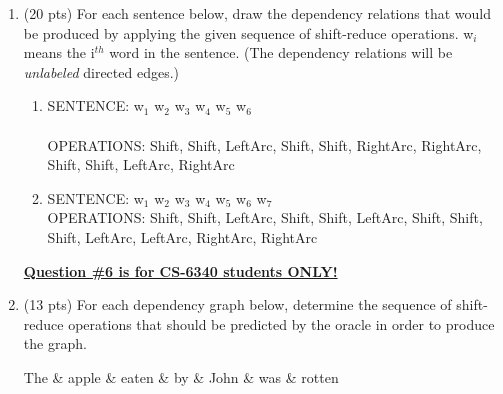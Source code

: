 \documentclass[11pt]{article}
\begin{document}
\begin{enumerate}
\newpage
\item (20 pts) For each sentence below, draw the dependency relations
  that would be produced by applying the given sequence of
  shift-reduce operations. w$_{i}$ means the i$^{th}$ word in the
  sentence. (The dependency relations will be {\it unlabeled} directed
  edges.)
  \\
	
	\begin{enumerate}
		\item
		SENTENCE: w$_{1}$ w$_{2}$ w$_{3}$ w$_{4}$ w$_{5}$ w$_{6}$ \\\\
		OPERATIONS: Shift, Shift, LeftArc, Shift, Shift, RightArc, RightArc, Shift, Shift, LeftArc, RightArc \\

		\vspace{.5in}
	
	
	
		\item
		SENTENCE: w$_{1}$ w$_{2}$ w$_{3}$ w$_{4}$ w$_{5}$ w$_{6}$ w$_{7}$ \\
		
		OPERATIONS: Shift, Shift, LeftArc, Shift, Shift, LeftArc, Shift, Shift, Shift, LeftArc, LeftArc, RightArc, RightArc\\

		\vspace{.5in}
	\end{enumerate}

\newpage

\underline{\textbf{Question \#6 is for CS-6340 students ONLY!}}  \\

\item	(13 pts) For each dependency graph below, 
        determine the sequence of shift-reduce operations that should be
        predicted by the oracle in order to produce the graph.\\ 

	\vspace{0.5in}
	\begin{dependency}[edge slant=15pt,label theme = simple, edge theme = iron]
  		\begin{deptext}[column sep=1em]
    			The \& apple \&  eaten \& by \& John \& was \& rotten\\ \\ \\
  		\end{deptext}


\end{dependency}
\end{enumerate}
\end{document}
